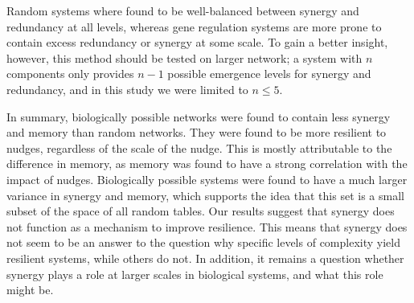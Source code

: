 \documentclass[../main.tex]{subfiles}
\begin{document}
Random systems where found to be well-balanced between synergy and redundancy at all levels, whereas gene regulation systems are more prone to contain excess redundancy or synergy at some scale.
To gain a better insight, however, this method should be tested on larger network; a system with $n$ components only provides $n-1$ possible emergence levels for synergy and redundancy, and in this study we were limited to $n \le 5$.

In summary, biologically possible networks were found to contain less synergy and memory than random networks.
They were found to be more resilient to nudges, regardless of the scale of the nudge.
This is mostly attributable to the difference in memory, as memory was found to have a strong correlation with the impact of nudges.
Biologically possible systems were found to have a much larger variance in synergy and memory, which supports the idea that this set is a small subset of the space of all random tables.
Our results suggest that synergy does not function as a mechanism to improve resilience.
This means that synergy does not seem to be an answer to the question why specific levels of complexity yield resilient systems, while others do not.
In addition, it remains a question whether synergy plays a role at larger scales in biological systems, and what this role might be. %
\end{document}
